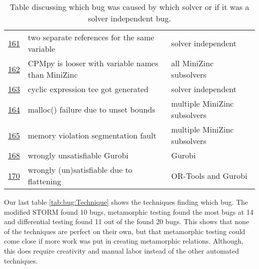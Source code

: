 \begin{table}[]
\begin{tabular}{lll}
		\href{https://github.com/CPMpy/cpmpy/issues/161}{161} & two separate references for the same variable     & solver independent           \\
		\href{https://github.com/CPMpy/cpmpy/issues/162}{162} & CPMpy is looser with variable names than MiniZinc & all MiniZinc subsolvers      \\
		\href{https://github.com/CPMpy/cpmpy/issues/163}{163} & cyclic expression tee got generated               & solver independent           \\
		\href{https://github.com/CPMpy/cpmpy/issues/164}{164} & malloc() failure due to unset bounds              & multiple MiniZinc subsolvers \\
		\href{https://github.com/CPMpy/cpmpy/issues/165}{165} & memory violation segmentation fault               & multiple MiniZinc subsolvers \\
		\href{https://github.com/CPMpy/cpmpy/issues/168}{168} & wrongly unsatisfiable Gurobi                      & Gurobi                       \\
		\href{https://github.com/CPMpy/cpmpy/issues/170}{170} & wrongly (un)satisfiable due to flattening         & OR-Tools and Gurobi          \\ \bottomrule
	\end{tabular}
	\caption{Table discussing which bug was caused by which solver or if it was a solver independent bug.}
	\label{tab:bug:Solver}
\end{table}

Our last table \ref{tab:bug:Technique} shows the techniques finding which bug. The modified STORM found 10 bugs, metamorphic testing found the most bugs at 14 and differential testing found 11 out of the found 20 bugs. This shows that none of the techniques are perfect on their own, but that metamorphic testing could come close if more work was put in creating metamorphic relations. Although, this does require creativity and manual labor instead of the other automated techniques.

